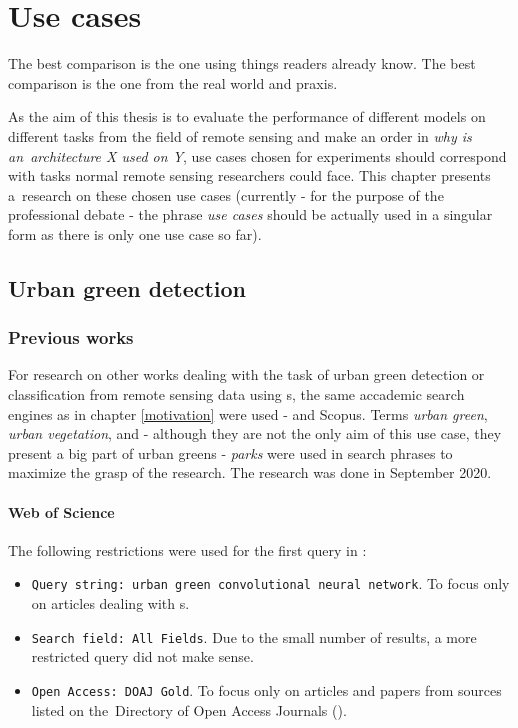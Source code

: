 \chapter{Use cases}
\label{use-cases}

The best comparison is the one using things readers already know. The best comparison is the one from the real world and praxis.

As the aim of this thesis is to evaluate the performance of different  models on different tasks from the field of remote sensing and make an order in \textit{why is an~architecture X used on Y}, use cases chosen for experiments should correspond with tasks normal remote sensing researchers could face. This chapter presents a~research on these chosen use cases (currently - for the purpose of the professional debate - the phrase \textit{use cases} should be actually used in a singular form as there is only one use case so far).

\section{Urban green detection}
\label{urban-green}

\subsection{Previous works}
\label{urban-green-situation}

For research on other works dealing with the task of urban green detection or classification from remote sensing data using s, the same accademic search engines as in chapter \ref{motivation} were used -  and Scopus. Terms \textit{urban green}, \textit{urban vegetation}, and - although they are not the only aim of this use case, they present a big part of urban greens - \textit{parks} were used in search phrases to maximize the grasp of the research. The research was done in September 2020.

\subsubsection{Web of Science}
\label{urban-green-wos}

The following restrictions were used for the first query in :

\begin{itemize}
	\item \verb|Query string: urban green convolutional neural network|. To focus only on articles dealing with s.
	\item \verb|Search field: All Fields|. Due to the small number of results, a more restricted query did not make sense.
	\item \verb|Open Access: DOAJ Gold|. To focus only on articles and papers from sources listed on the~Di\-rectory of Open Access Journals ().
\end{itemize}

